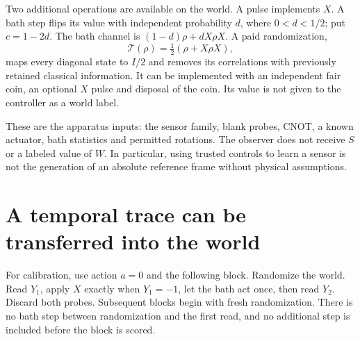 \documentclass[11pt,a4paper]{article}
\begin{document}
Two additional operations are available on the world. A pulse implements $X$. A bath step flips its value with independent probability $d$, where $0<d<1/2$; put $c=1-2d$. The bath channel is $(1-d)\rho+dX\rho X$. A paid randomization,
\begin{equation}\label{eq:twirl}
 \mathcal T(\rho)=\tfrac12(\rho+X\rho X),
\end{equation}
maps every diagonal state to $I/2$ and removes its correlations with previously retained classical information. It can be implemented with an independent fair coin, an optional $X$ pulse and disposal of the coin. Its value is not given to the controller as a world label.

These are the apparatus inputs: the sensor family, blank probes, CNOT, a known actuator, bath statistics and permitted rotations. The observer does not receive $S$ or a labeled value of $W$. In particular, using trusted controls to learn a sensor is not the generation of an absolute reference frame without physical assumptions.

\section{A temporal trace can be transferred into the world}
\label{sec:transfer}

For calibration, use action $a=0$ and the following block. Randomize the world. Read $Y_1$, apply $X$ exactly when $Y_1=-1$, let the bath act once, then read $Y_2$. Discard both probes. Subsequent blocks begin with fresh randomization. There is no bath step between randomization and the first read, and no additional step is included before the block is scored.
\end{document}
